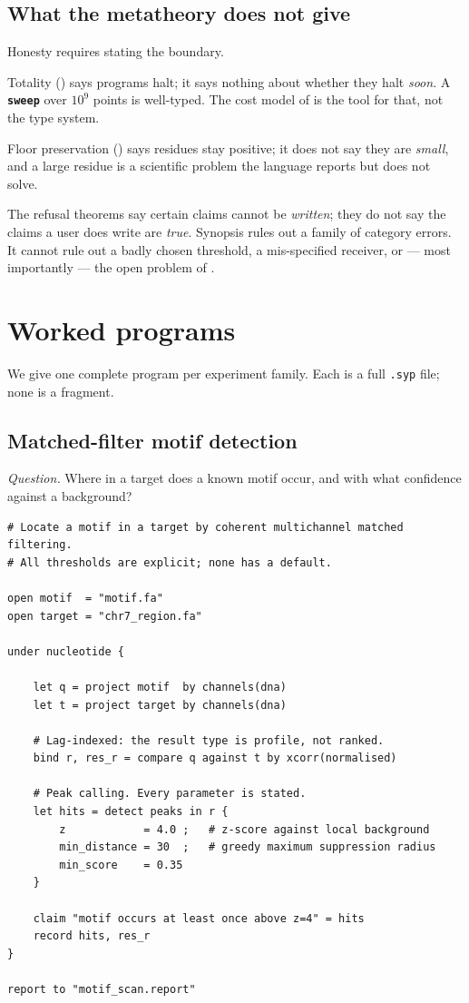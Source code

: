 \documentclass[11pt,twocolumn,a4paper]{article}
\theoremstyle{plain}
\theoremstyle{definition}
\theoremstyle{remark}
\newcommand{\kw}[1]{\texttt{\textbf{#1}}}
\begin{document}
\subsection{What the metatheory does not give}

Honesty requires stating the boundary.

Totality () says programs halt; it says nothing about
whether they halt \emph{soon}. A \kw{sweep} over $10^9$ points is
well-typed. The cost model of  is the tool for that,
not the type system.

Floor preservation () says residues stay positive;
it does not say they are \emph{small}, and a large residue is a
scientific problem the language reports but does not solve.

The refusal theorems say certain claims cannot be \emph{written}; they
do not say the claims a user does write are \emph{true}. Synopsis rules
out a family of category errors. It cannot rule out a badly chosen
threshold, a mis-specified receiver, or --- most importantly --- the
open problem of .

\section{Worked programs}
\label{sec:programs}

We give one complete program per experiment family. Each is a full
\texttt{.syp} file; none is a fragment.

\subsection{Matched-filter motif detection}
\label{sec:prog-motif}

\emph{Question.} Where in a target does a known motif occur, and with
what confidence against a background?

\begin{lstlisting}[caption={\texttt{motif\_scan.syp}}]
# Locate a motif in a target by coherent multichannel matched filtering.
# All thresholds are explicit; none has a default.

open motif  = "motif.fa"
open target = "chr7_region.fa"

under nucleotide {

    let q = project motif  by channels(dna)
    let t = project target by channels(dna)

    # Lag-indexed: the result type is profile, not ranked.
    bind r, res_r = compare q against t by xcorr(normalised)

    # Peak calling. Every parameter is stated.
    let hits = detect peaks in r {
        z            = 4.0 ;   # z-score against local background
        min_distance = 30  ;   # greedy maximum suppression radius
        min_score    = 0.35
    }

    claim "motif occurs at least once above z=4" = hits
    record hits, res_r
}

report to "motif_scan.report"
\end{lstlisting}
\end{document}
